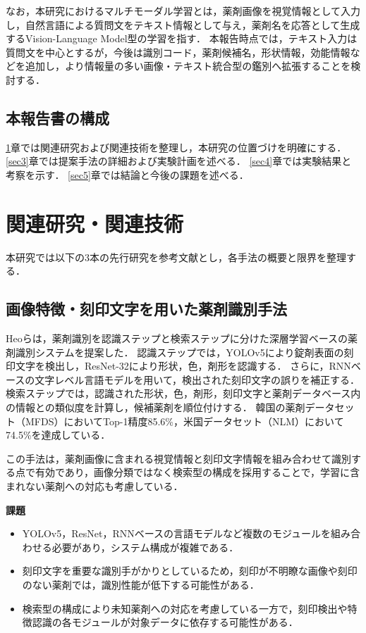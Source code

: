 \documentclass{jsarticle}
\begin{document}
なお，本研究におけるマルチモーダル学習とは，薬剤画像を視覚情報として入力し，自然言語による質問文をテキスト情報として与え，薬剤名を応答として生成するVision-Language Model型の学習を指す．
本報告時点では，テキスト入力は質問文を中心とするが，今後は識別コード，薬剤候補名，形状情報，効能情報などを追加し，より情報量の多い画像・テキスト統合型の鑑別へ拡張することを検討する．

\subsection{本報告書の構成}

\ref{sec2}章では関連研究および関連技術を整理し，本研究の位置づけを明確にする．
\ref{sec3}章では提案手法の詳細および実験計画を述べる．
\ref{sec4}章では実験結果と考察を示す．
\ref{sec5}章では結論と今後の課題を述べる．

\newpage

\section{関連研究・関連技術}\label{sec2}

本研究では以下の3本の先行研究を参考文献とし，各手法の概要と限界を整理する．

\subsection{画像特徴・刻印文字を用いた薬剤識別手法}

Heoら\cite{heo2023pill}は，薬剤識別を認識ステップと検索ステップに分けた深層学習ベースの薬剤識別システムを提案した．
認識ステップでは，YOLOv5により錠剤表面の刻印文字を検出し，ResNet-32により形状，色，剤形を認識する．
さらに，RNNベースの文字レベル言語モデルを用いて，検出された刻印文字の誤りを補正する．
検索ステップでは，認識された形状，色，剤形，刻印文字と薬剤データベース内の情報との類似度を計算し，候補薬剤を順位付けする．
韓国の薬剤データセット（MFDS）においてTop-1精度85.6\%，米国データセット（NLM）において74.5\%を達成している．

この手法は，薬剤画像に含まれる視覚情報と刻印文字情報を組み合わせて識別する点で有効であり，画像分類ではなく検索型の構成を採用することで，学習に含まれない薬剤への対応も考慮している．

\textbf{課題}
\begin{itemize}
  \item YOLOv5，ResNet，RNNベースの言語モデルなど複数のモジュールを組み合わせる必要があり，システム構成が複雑である．
  \item 刻印文字を重要な識別手がかりとしているため，刻印が不明瞭な画像や刻印のない薬剤では，識別性能が低下する可能性がある．
  \item 検索型の構成により未知薬剤への対応を考慮している一方で，刻印検出や特徴認識の各モジュールが対象データに依存する可能性がある．
\end{itemize}
\end{document}
